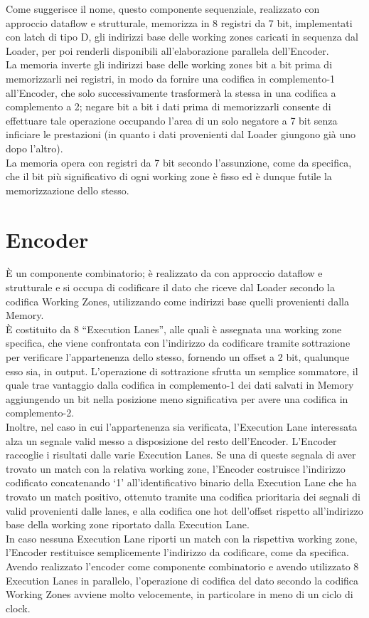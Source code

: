\documentclass[10pt,english, openany]{book}
\begin{document}
Come suggerisce il nome, questo componente sequenziale, realizzato con approccio dataflow e strutturale, memorizza in 8 registri da 7 bit, implementati con latch di tipo D, gli indirizzi base delle working zones caricati in sequenza dal Loader, per poi renderli disponibili all’elaborazione parallela dell’Encoder.\\
La memoria inverte gli indirizzi base delle working zones bit a bit prima di memorizzarli nei registri, in modo da fornire una codifica in complemento-1 all’Encoder, che solo successivamente trasformerà la stessa in una codifica a complemento a 2; negare bit a bit i dati prima di memorizzarli consente di effettuare tale operazione occupando l’area di un solo negatore a 7 bit senza inficiare le prestazioni (in quanto i dati provenienti dal Loader giungono già uno dopo l’altro).\\
La memoria opera con registri da 7 bit secondo l’assunzione, come da specifica, che il bit più significativo di ogni working zone è fisso ed è dunque futile la memorizzazione dello stesso.

\section{Encoder}

È un componente combinatorio; è realizzato da con approccio dataflow e strutturale e si occupa di codificare il dato che riceve dal Loader secondo la codifica Working Zones, utilizzando come indirizzi base quelli provenienti dalla Memory.\\
È costituito da 8 “Execution Lanes”, alle quali è assegnata una working zone specifica, che viene confrontata con l'indirizzo da codificare tramite sottrazione per verificare l'appartenenza dello stesso, fornendo un offset a 2 bit, qualunque esso sia, in output. L’operazione di sottrazione sfrutta un semplice sommatore, il quale trae vantaggio dalla codifica in complemento-1 dei dati salvati in Memory aggiungendo un bit nella posizione meno significativa per avere una codifica in complemento-2.\\
Inoltre, nel caso in cui l’appartenenza sia verificata, l’Execution Lane interessata alza un segnale valid messo a disposizione del resto dell’Encoder.
L’Encoder raccoglie i risultati dalle varie Execution Lanes. Se una di queste segnala di aver trovato un match con la relativa working zone, l’Encoder costruisce l’indirizzo codificato concatenando ‘1’ all’identificativo binario della Execution Lane che ha trovato un match positivo, ottenuto tramite una codifica prioritaria dei segnali di valid provenienti dalle lanes, e alla codifica one hot dell’offset rispetto all'indirizzo base della working zone riportato dalla Execution Lane.\\
In caso nessuna Execution Lane riporti un match con la rispettiva working zone, l’Encoder restituisce semplicemente l’indirizzo da codificare, come da specifica.\\
Avendo realizzato l’encoder come componente combinatorio e avendo utilizzato 8 Execution Lanes in parallelo, l’operazione di codifica del dato secondo la codifica Working Zones avviene molto velocemente, in particolare in meno di un ciclo di clock.
\end{document}
